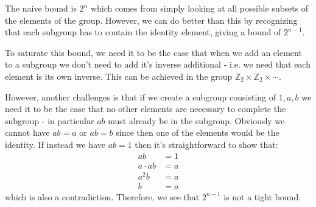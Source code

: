 \documentclass{article}
\begin{document}
The naive bound is $ 2^{n} $ which comes from simply looking at all possible subsets of the elements of the group. However, we can do better than this by recognizing that each subgroup has to contain the identity element, giving a bound of $ 2^{n-1} $.

To saturate this bound, we need it to be the case that when we add an element to a subgroup we don't need to add it's inverse additional - i.e. we need that each element is its own inverse. This can be achieved in the group $ \mathbb{Z}_{2} \times \mathbb{Z}_{2} \times \cdots $.

However, another challenges is that if we create a subgroup consisting of $ 1, a, b $ we need it to be the case that no other elements are necessary to complete the subgroup - in particular $ab$ must already be in the subgroup. Obviously we cannot have $ ab = a$ or $ab = b$ since then one of the elements would be the identity. If instead we have $ab = 1$ then it's straightforward to show that:
\begin{subequations}
\begin{align}
ab & = 1 \\
a\cdot ab &= a \\
a^{2}b & = a \\
b & = a
\end{align}
\end{subequations}
which is also a contradiction. Therefore, we see that $2^{n-1}$ is not a tight bound.
\end{document}
